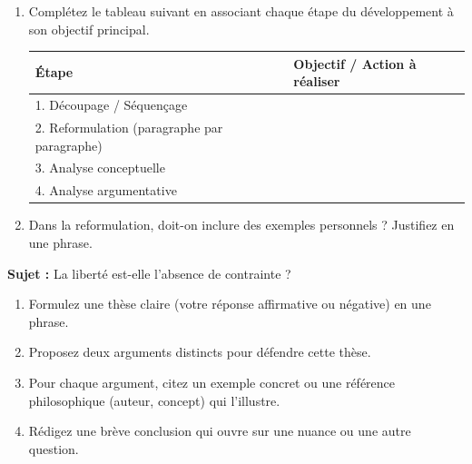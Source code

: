 \documentclass[11pt]{article}
\begin{document}
\begin{exercice}
\begin{enumerate}
    \item Complétez le tableau suivant en associant chaque étape du développement à son objectif principal.
    \begin{tabular}{|p{4cm}|p{10cm}|}
    \hline
    \textbf{Étape} & \textbf{Objectif / Action à réaliser} \\ \hline
    1. Découpage / Séquençage & \\ \hline
    2. Reformulation (paragraphe par paragraphe) & \\ \hline
    3. Analyse conceptuelle & \\ \hline
    4. Analyse argumentative & \\ \hline
    \end{tabular}
    \item Dans la reformulation, doit-on inclure des exemples personnels ? Justifiez en une phrase.
\end{enumerate}
\end{exercice}

\begin{exercice}
\textbf{Sujet :} \og{} La liberté est-elle l'absence de contrainte ? \fg{}

\begin{enumerate}
    \item Formulez une thèse claire (votre réponse affirmative ou négative) en une phrase.
    \item Proposez deux arguments distincts pour défendre cette thèse.
    \item Pour chaque argument, citez un exemple concret ou une référence philosophique (auteur, concept) qui l'illustre.
    \item Rédigez une brève conclusion qui ouvre sur une nuance ou une autre question.
\end{enumerate}
\end{exercice}
\end{document}
